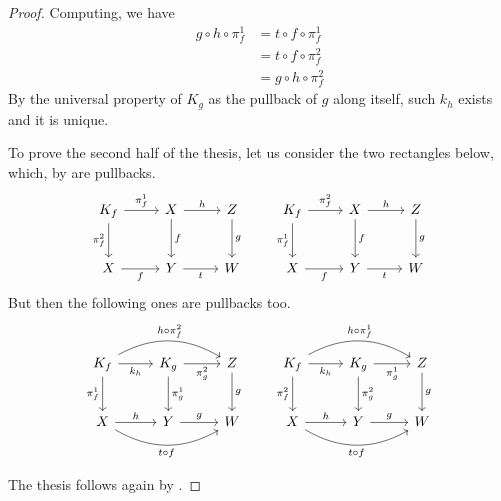 \documentclass[runningheads,envcountsect]{llncs}
\theoremstyle{plain}
\theoremstyle{definition}
\begin{document}
\begin{proof}
    Computing, we have
    \begin{align*}
        g \circ h \circ \pi_f^1 &=  t \circ f \circ \pi_f^1     \\
                                &=  t \circ f \circ \pi_f^2     \\
                                &=  g \circ h \circ \pi_f^2
    \end{align*}
    By the universal property of $K_g$ as the pullback of $g$ along itself, such $k_h$ exists and it is unique.

    To prove the second half of the thesis, let us consider the two rectangles below, which, by  are pullbacks.
    \[\begin{tikzcd}[row sep= 25 pt, column sep= 25 pt]
	{K_f} & X & Z \\
	X & Y & W
	\arrow["{\pi_f^1}", from=1-1, to=1-2]
	\arrow["{\pi_f^2}"', from=1-1, to=2-1]
	\arrow["h", from=1-2, to=1-3]
	\arrow["f", from=1-2, to=2-2]
	\arrow["g", from=1-3, to=2-3]
	\arrow["f"', from=2-1, to=2-2]
	\arrow["t"', from=2-2, to=2-3]
    \end{tikzcd}
    \qquad
    \begin{tikzcd}[row sep = 25 pt, column sep=25 pt]
	{K_f} & X & Z \\
	X & Y & W
	\arrow["{\pi_f^2}", from=1-1, to=1-2]
	\arrow["{\pi_f^1}"', from=1-1, to=2-1]
	\arrow["h", from=1-2, to=1-3]
	\arrow["f", from=1-2, to=2-2]
	\arrow["g", from=1-3, to=2-3]
	\arrow["f"', from=2-1, to=2-2]
	\arrow["t"', from=2-2, to=2-3]
    \end{tikzcd}
    \]
    But then the following ones are pullbacks too.
    \[\begin{tikzcd}[row sep= 25 pt, column sep= 25 pt]
	{K_f} & {K_g} & Z \\
	X & Y & W
	\arrow["{k_h}"', from=1-1, to=1-2]
	\arrow["{\pi_f^1}"', from=1-1, to=2-1]
	\arrow["{\pi_g^2}"', from=1-2, to=1-3]
	\arrow["{\pi_g^1}", from=1-2, to=2-2]
	\arrow["g", from=1-3, to=2-3]
	\arrow["h", from=2-1, to=2-2]
	\arrow["g", from=2-2, to=2-3]
        \arrow["{h\circ \pi_f^2}", from=1-1, to=1-3, bend left = 30]
        \arrow["{t \circ f}"', from=2-1, to=2-3, bend right = 30]
    \end{tikzcd}
    \qquad
    \begin{tikzcd}[row sep = 25 pt, column sep=25 pt]
	{K_f} & {K_g} & Z \\
	X & Y & W
	\arrow["{k_h}"', from=1-1, to=1-2]
	\arrow["{\pi_f^2}"', from=1-1, to=2-1]
	\arrow["{\pi_g^1}"', from=1-2, to=1-3]
	\arrow["{\pi_g^2}", from=1-2, to=2-2]
	\arrow["g", from=1-3, to=2-3]
	\arrow["h", from=2-1, to=2-2]
	\arrow["g", from=2-2, to=2-3]
        \arrow["{h\circ \pi_f^1}", from=1-1, to=1-3, bend left = 30]
        \arrow["{t \circ f}"', from=2-1, to=2-3, bend right = 30]
    \end{tikzcd}
    \]

    The thesis follows again by .
\end{proof}
\end{document}
